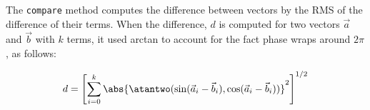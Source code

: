 The \lstinline{compare} method computes the difference between vectors by the RMS of the difference of their terms. When the difference, \(d\) is computed for two vectors \(\vec{a}\) and \(\vec{b}\) with \(k\) terms, it used arctan to account for the fact phase wraps around \(2\pi\), as follows:

\begin{equation}
  d = \left[ \sum_{i=0}^{k}\abs{\atantwo(\sin(\vec{a}_i - \vec{b}_i), \cos(\vec{a}_i - \vec{b}_i))}^2 \right]^{1/2}
\end{equation}

